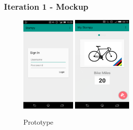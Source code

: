 \subsubsection{Iteration 1 - Mockup}

\begin{figure}[H]
 \centering
  \includegraphics[width=0.24\textwidth]{img/loginMockup.png}
   \includegraphics[width=0.26\textwidth]{img/MainMockup.png}
    \caption{Prototype}
\end{figure}

